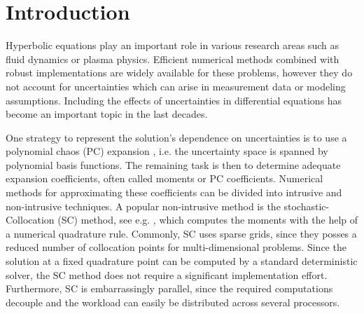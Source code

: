 \section{Introduction}
Hyperbolic equations play an important role in various research areas such as fluid dynamics or plasma physics. Efficient numerical methods combined with robust implementations are widely available for these problems, however they do not account for uncertainties which can arise in measurement data or modeling assumptions. Including the effects of uncertainties in differential equations has become an important topic in the last decades. %

One strategy to represent the solution's dependence on uncertainties is to use a polynomial chaos (PC) expansion \cite{wiener1938homogeneous,xiu2002wiener}, i.e. the uncertainty space is spanned by polynomial basis functions. The remaining task is then to determine adequate expansion coefficients, often called moments or PC coefficients. Numerical methods for approximating these coefficients can be divided into intrusive and non-intrusive techniques. A popular non-intrusive method is the stochastic-Collocation (SC) method, see e.g. \cite{xiu2005high,babuvska2007stochastic,loeven2008probabilistic}, which computes the moments with the help of a numerical quadrature rule. Commonly, SC uses sparse grids, since they posses a reduced number of collocation points for multi-dimensional problems. Since the solution at a fixed quadrature point can be computed by a standard deterministic solver, the SC method does not require a significant implementation effort. Furthermore, SC is embarrassingly parallel, since the required computations decouple and the workload can easily be distributed across several processors. 

